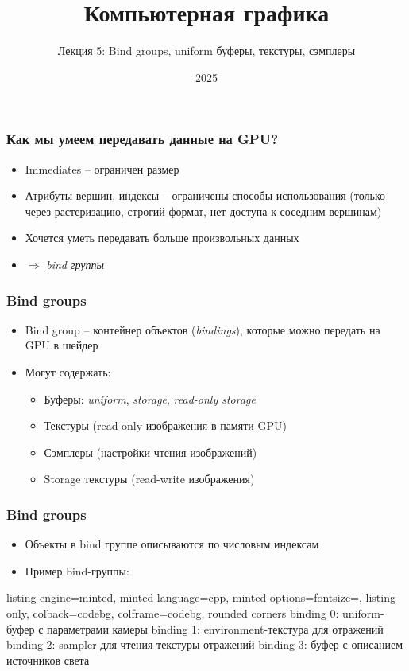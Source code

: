 \documentclass[10pt]{beamer}
\title{Компьютерная графика}
\subtitle{Лекция 5: Bind groups, uniform буферы, текстуры, сэмплеры}
\date{2025}
\begin{document}
\frame{\titlepage}

\begin{frame}[fragile]
\frametitle{Как мы умеем передавать данные на GPU?}
\begin{itemize}
\item Immediates -- ограничен размер
\pause
\item Атрибуты вершин, индексы -- ограничены способы использования (только через растеризацию, строгий формат, нет доступа к соседним вершинам)
\pause
\item Хочется уметь передавать больше произвольных данных
\pause
\item \(\Longrightarrow\) \textit{bind группы}
\end{itemize}
\end{frame}

\begin{frame}[fragile]
\frametitle{Bind groups}
\begin{itemize}
\item Bind group -- контейнер объектов (\textit{bindings}), которые можно передать на GPU в шейдер
\pause
\item Могут содержать:
\begin{itemize}
\item Буферы: \textit{uniform}, \textit{storage}, \textit{read-only storage}
\pause
\item Текстуры (read-only изображения в памяти GPU)
\pause
\item Сэмплеры (настройки чтения изображений)
\pause
\item Storage текстуры (read-write изображения)
\end{itemize}
\end{itemize}
\end{frame}

\begin{frame}[fragile]
\frametitle{Bind groups}
\begin{itemize}
\item Объекты в bind группе описываются по числовым индексам
\pause
\item Пример bind-группы:
\end{itemize}
\begin{tcblisting}{listing engine=minted, minted language=cpp, minted options={fontsize=\scriptsize}, listing only, colback=codebg, colframe=codebg, rounded corners}
binding 0: uniform-буфер с параметрами камеры
binding 1: environment-текстура для отражений
binding 2: sampler для чтения текстуры отражений
binding 3: буфер с описанием источников света
\end{tcblisting}
\end{frame}
\end{document}
